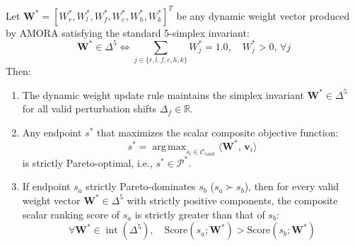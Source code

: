 \begin{theorem}
Let $\mathbf{W}^* = [W_r^*, W_l^*, W_f^*, W_c^*, W_h^*, W_k^*]^T$ be any dynamic weight vector produced by AMORA satisfying the standard 5-simplex invariant:
\begin{equation}
    \mathbf{W}^* \in \Delta^5 \iff \sum_{j \in \{r, l, f, c, h, k\}} W_j^* = 1.0, \quad W_j^* > 0, \, \forall j
\end{equation}
Then:
\begin{enumerate}
    \item The dynamic weight update rule maintains the simplex invariant $\mathbf{W}^* \in \Delta^5$ for all valid perturbation shifts $\Delta_f \in \mathbb{R}$.
    \item Any endpoint $s^*$ that maximizes the scalar composite objective function:
    \begin{equation}
        s^* = \operatorname{arg\,max}_{s_i \in \mathcal{C}_{\text{cand}}} \langle \mathbf{W}^*, \, \mathbf{v}_i \rangle
    \end{equation}
    is strictly Pareto-optimal, i.e., $s^* \in \mathcal{P}^*$.
    \item If endpoint $s_a$ strictly Pareto-dominates $s_b$ ($s_a \succ s_b$), then for every valid weight vector $\mathbf{W}^* \in \Delta^5$ with strictly positive components, the composite scalar ranking score of $s_a$ is strictly greater than that of $s_b$:
    \begin{equation}
        \forall \mathbf{W}^* \in \operatorname{int}(\Delta^5), \quad \text{Score}(s_a; \mathbf{W}^*) > \text{Score}(s_b; \mathbf{W}^*)
    \end{equation}
\end{enumerate}
\end{theorem}

